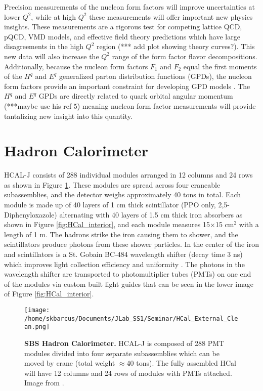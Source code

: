 \documentclass[review]{elsarticle}
\newcommand{\hcal}{HCAL-J }
\newcommand{\q}{$Q^2$ }
\begin{document}
	Precision measurements of the nucleon form factors will improve uncertainties at lower $Q^2$, while at high \q these measurements will offer important new physics insights. These measurements are a rigorous test for competing lattice QCD, pQCD, VMD models, and effective field theory predictions which have large disagreements in the high \q region (*** add plot showing theory curves?). This new data will also increase the \q range of the form factor flavor decompositions. Additionally, because the nucleon form factors $F_1$ and $F_2$ equal the first moments of the $H^q$ and $E^q$ generalized parton distribution functions (GPDs), the nucleon form factors provide an important constraint for developing GPD models \cite{gen_proposal}. The $H^q$ and $E^q$ GPDs are directly related to quark orbital angular momentum \cite{cisbani_2014}(***maybe use his ref 5) meaning nucleon form factor measurements will provide tantalizing new insight into this quantity.  

\section{Hadron Calorimeter}

\hcal consists of 288 individual modules arranged in 12 columns and 24 rows as shown in Figure \ref{fig:HCal}. These modules are spread across four craneable subassemblies, and the detector weighs approximately 40 tons in total. Each module is made up of 40 layers of 1 cm thick scintillator (PPO only, 2,5-Diphenyloxazole) alternating with 40 layers of 1.5 cm thick iron absorbers as shown in Figure \ref{fig:HCal_interior}, and each module measures 15$\times$15 cm$^2$ with a length of 1 m. The hadrons strike the iron causing them to shower, and the scintillators produce photons from these shower particles. In the center of the iron and scintillators is a St. Gobain BC-484 wavelength shifter (decay time 3 ns) which improves light collection efficiency and uniformity \cite{brio_2018}. The photons in the wavelength shifter are transported to photomultiplier tubes (PMTs) on one end of the modules via custom built light guides that can be seen in the lower image of Figure \ref{fig:HCal_interior}.

	\begin{figure}[!ht]
	\begin{center}
	\texttt{[image: /home/skbarcus/Documents/JLab\_SS1/Seminar/HCal\_External\_Clean.png]}
	\end{center}
	\caption{
	{\bf{SBS Hadron Calorimeter.}} \hcal is composed of 288 PMT modules divided into four separate subassemblies which can be moved by crane (total weight $\approx$40 tons). The fully assembled HCal will have 12 columns and 24 rows of modules with PMTs attached. Image from \cite{brio_2018}.}
	\label{fig:HCal}
	\end{figure}	
	
\end{document}
